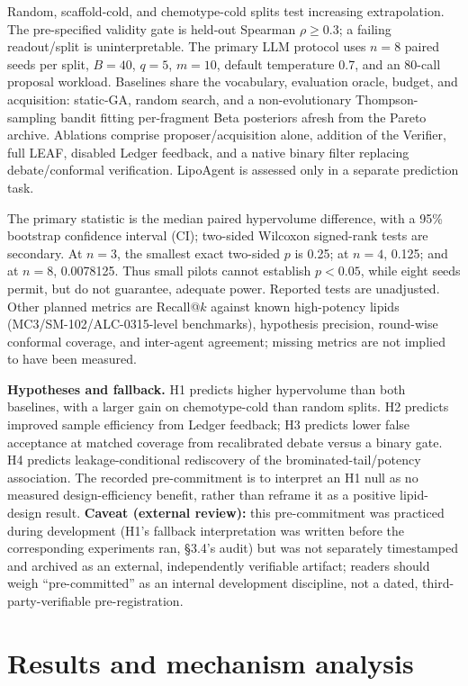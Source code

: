 \documentclass{article}
\begin{document}
Random, scaffold-cold, and chemotype-cold splits test increasing extrapolation. The pre-specified validity gate is held-out Spearman $\rho\ge0.3$; a failing readout/split is uninterpretable. The primary LLM protocol uses $n=8$ paired seeds per split, $B=40$, $q=5$, $m=10$, default temperature 0.7, and an 80-call proposal workload. Baselines share the vocabulary, evaluation oracle, budget, and acquisition: static-GA, random search, and a non-evolutionary Thompson-sampling bandit fitting per-fragment Beta posteriors afresh from the Pareto archive. Ablations comprise proposer/acquisition alone, addition of the Verifier, full LEAF, disabled Ledger feedback, and a native binary filter replacing debate/conformal verification. LipoAgent is assessed only in a separate prediction task.

The primary statistic is the median paired hypervolume difference, with a 95\% bootstrap confidence interval (CI); two-sided Wilcoxon signed-rank tests are secondary. At $n=3$, the smallest exact two-sided $p$ is 0.25; at $n=4$, 0.125; and at $n=8$, 0.0078125. Thus small pilots cannot establish $p<0.05$, while eight seeds permit, but do not guarantee, adequate power. Reported tests are unadjusted. Other planned metrics are Recall@$k$ against known high-potency lipids (MC3/SM-102/ALC-0315-level benchmarks), hypothesis precision, round-wise conformal coverage, and inter-agent agreement; missing metrics are not implied to have been measured.

\textbf{Hypotheses and fallback.} H1 predicts higher hypervolume than both baselines, with a larger gain on chemotype-cold than random splits. H2 predicts improved sample efficiency from Ledger feedback; H3 predicts lower false acceptance at matched coverage from recalibrated debate versus a binary gate. H4 predicts leakage-conditional rediscovery of the brominated-tail/potency association. The recorded pre-commitment is to interpret an H1 null as no measured design-efficiency benefit, rather than reframe it as a positive lipid-design result. \textbf{Caveat (external review):} this pre-commitment was practiced during development (H1's fallback interpretation was written before the corresponding experiments ran, \S3.4's audit) but was not separately timestamped and archived as an external, independently verifiable artifact; readers should weigh ``pre-committed'' as an internal development discipline, not a dated, third-party-verifiable pre-registration.

\section{Results and mechanism analysis}
\label{sec:results}
\end{document}
